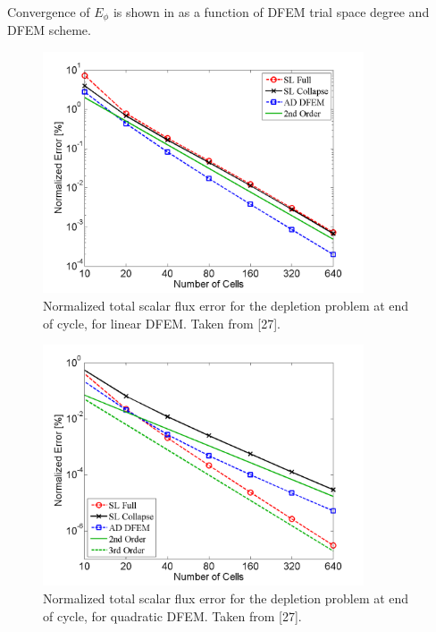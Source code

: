 Convergence of $E_{\phi}$ is shown in  as a function of DFEM trial space degree and DFEM scheme.
\begin{figure}[!hbp]
\centering
\includegraphics[width=9.5cm]{chapter5_depletion/Flux_P1_norm_err.png}
\caption{Normalized total scalar flux error for the depletion problem at end of cycle, for linear DFEM.  Taken from [27].}
\label{fig:depletion_flux_p1}
\end{figure}

\pagebreak

\begin{figure}[!htp]
\centering
\includegraphics[width=9.5cm]{chapter5_depletion/Flux_P2_norm_err.png}
\caption{Normalized total scalar flux error for the depletion problem at end of cycle, for quadratic DFEM.  Taken from [27].}
\label{fig:depletion_flux_p2}
\end{figure}

